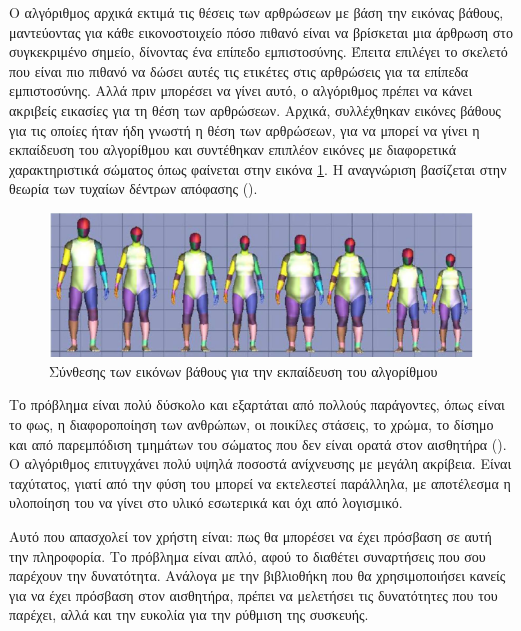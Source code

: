 Ο αλγόριθμος αρχικά εκτιμά τις θέσεις των αρθρώσεων με βάση την εικόνας βάθους, μαντεύοντας για κάθε εικονοστοιχείο πόσο πιθανό είναι να βρίσκεται μια άρθρωση στο συγκεκριμένο σημείο, δίνοντας ένα επίπεδο εμπιστοσύνης. Έπειτα επιλέγει το σκελετό που είναι πιο πιθανό να δώσει αυτές τις ετικέτες στις αρθρώσεις για τα επίπεδα εμπιστοσύνης. Αλλά πριν μπορέσει να γίνει αυτό, ο αλγόριθμος πρέπει να κάνει ακριβείς εικασίες για τη θέση των αρθρώσεων. Αρχικά, συλλέχθηκαν εικόνες βάθους για τις οποίες ήταν ήδη γνωστή η θέση των αρθρώσεων, για να μπορεί να γίνει η εκπαίδευση του αλγορίθμου και συντέθηκαν επιπλέον εικόνες με διαφορετικά χαρακτηριστικά σώματος όπως φαίνεται στην εικόνα \ref{fig:kinect-data-synthesis}. Η αναγνώριση βασίζεται στην θεωρία των τυχαίων δέντρων απόφασης ().

\begin{figure}[H]
    \centering
    \includegraphics[width=.9\textwidth]{kinect/fig/kinect-data-synthesis.png}
    \caption{Σύνθεσης των εικόνων βάθους για την εκπαίδευση του αλγορίθμου\cite{shotton11}}
    \label{fig:kinect-data-synthesis}
\end{figure}

Το πρόβλημα είναι πολύ δύσκολο και εξαρτάται από πολλούς παράγοντες, όπως είναι το φως, η διαφοροποίηση των ανθρώπων, οι ποικίλες στάσεις, το χρώμα, το δίσημο και από παρεμπόδιση τμημάτων του σώματος που δεν είναι ορατά στον αισθητήρα (). Ο αλγόριθμος επιτυγχάνει πολύ υψηλά ποσοστά ανίχνευσης με μεγάλη ακρίβεια. Είναι ταχύτατος, γιατί από την φύση του μπορεί να εκτελεστεί παράλληλα, με αποτέλεσμα η υλοποίηση του να γίνει στο υλικό εσωτερικά και όχι από λογισμικό.

Αυτό που απασχολεί τον χρήστη είναι: πως θα μπορέσει να έχει πρόσβαση σε αυτή την πληροφορία. Το πρόβλημα είναι απλό, αφού το  διαθέτει συναρτήσεις που σου παρέχουν την δυνατότητα. Ανάλογα με την βιβλιοθήκη που θα χρησιμοποιήσει κανείς για να έχει πρόσβαση στον αισθητήρα, πρέπει να μελετήσει τις δυνατότητες που του παρέχει, αλλά και την ευκολία για την ρύθμιση της συσκευής.

